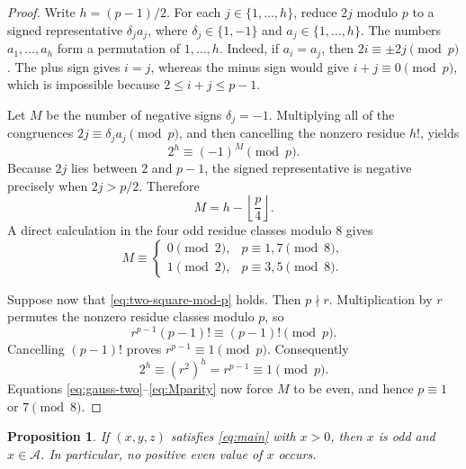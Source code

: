 \documentclass[a4paper,11pt]{amsart}
\numberwithin{equation}{section}
\newtheorem{proposition}[theorem]{Proposition}
\theoremstyle{definition}
\theoremstyle{remark}
\newcommand{\Acal}{\mathcal A}
\begin{document}
\begin{proof}
Write \(h=(p-1)/2\).  For each \(j\in\{1,\ldots,h\}\), reduce \(2j\)
modulo \(p\) to a signed representative
\(\delta_j a_j\), where \(\delta_j\in\{1,-1\}\) and
\(a_j\in\{1,\ldots,h\}\).  The numbers \(a_1,\ldots,a_h\) form a
permutation of \(1,\ldots,h\).  Indeed, if
\(a_i=a_j\), then \(2i\equiv\pm2j\pmod p\).  The plus sign gives \(i=j\),
whereas the minus sign would give \(i+j\equiv0\pmod p\), which is impossible
because \(2\leq i+j\leq p-1\).

Let \(M\) be the number of negative signs \(\delta_j=-1\).  Multiplying all
of the congruences \(2j\equiv\delta_ja_j\pmod p\), and then cancelling the
nonzero residue \(h!\), yields
\begin{equation}\label{eq:gauss-two}
 2^h\equiv(-1)^M\pmod p.
\end{equation}
Because \(2j\) lies between \(2\) and \(p-1\), the signed representative is
negative precisely when \(2j>p/2\).  Therefore
\begin{equation}\label{eq:Mcount}
 M=h-\left\lfloor\frac p4\right\rfloor.
\end{equation}
A direct calculation in the four odd residue classes modulo \(8\) gives
\begin{equation}\label{eq:Mparity}
 M\equiv
 \begin{cases}
 0\pmod2,&p\equiv1,7\pmod8,\\
 1\pmod2,&p\equiv3,5\pmod8.
 \end{cases}
\end{equation}

Suppose now that \eqref{eq:two-square-mod-p} holds.  Then \(p\nmid r\).
Multiplication by \(r\) permutes the nonzero residue classes modulo \(p\), so
\begin{equation*}
 r^{p-1}(p-1)!\equiv(p-1)!\pmod p.
\end{equation*}
Cancelling \((p-1)!\) proves \(r^{p-1}\equiv1\pmod p\).  Consequently
\begin{equation}\label{eq:twoh-one}
 2^h\equiv(r^2)^h=r^{p-1}\equiv1\pmod p.
\end{equation}
Equations \eqref{eq:gauss-two}--\eqref{eq:Mparity} now force \(M\) to be
even, and hence \(p\equiv1\) or \(7\pmod8\).
\end{proof}

\begin{proposition}\label{prop:positive-restrictions}
If \((x,y,z)\) satisfies \eqref{eq:main} with \(x>0\), then \(x\) is odd and
\(x\in\Acal\).  In particular, no positive even value of \(x\) occurs.
\end{proposition}
\end{document}
